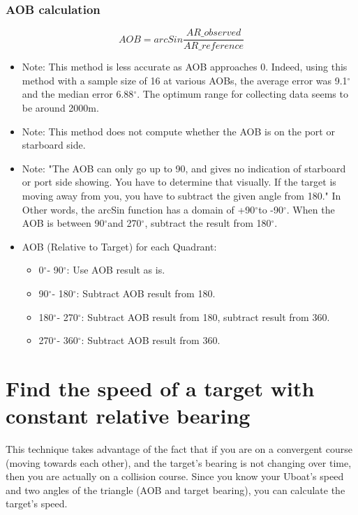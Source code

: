 \documentclass{article}
\newcommand{\degree}{$^{\circ}$}
\begin{document}
\subsubsection{AOB calculation}
$$AOB = arcSin \frac{AR\_{observed}}{AR\_{reference}}$$

\begin{itemize}
\item{Note: This method is less accurate as AOB approaches 0. Indeed, using this method with a sample size of 16 at various AOBs, the average error was 9.1\degree and the median error 6.88\degree. The optimum range for collecting data seems to be around 2000m.}
\item{Note: This method does not compute whether the AOB is on the port or starboard side.}
\item{Note: "The AOB can only go up to 90, and gives no indication of starboard or port side showing. You have to determine that visually. If the target is moving away from you, you have to subtract the given angle from 180."\cite[p~15]{angrHandB, tvreAcqData} In Other words, the arcSin function has a domain of +90\degree to -90\degree. When the AOB is between 90\degree and 270\degree, subtract the result from 180\degree. \cite{arcSin}}

\item{AOB (Relative to Target) for each Quadrant:}
\begin{itemize}
	\item{0\degree - 90\degree : Use AOB result as is.}
	\item{90\degree - 180\degree : Subtract AOB result 				 from 180.}
	\item{180\degree - 270\degree : Subtract AOB result from 180, subtract result from 360.}
	\item{270\degree - 360\degree : Subtract AOB result from 360.}
	\end{itemize}

\end{itemize}


\section{Find the speed of a target with constant relative bearing}

This technique takes advantage of the fact that if you are on a convergent course (moving towards each other), and the target’s bearing is not changing over time, then you are actually on a collision course. Since you know your Uboat’s speed and two angles of the triangle (AOB and target bearing), you can calculate the target’s speed.
\end{document}
